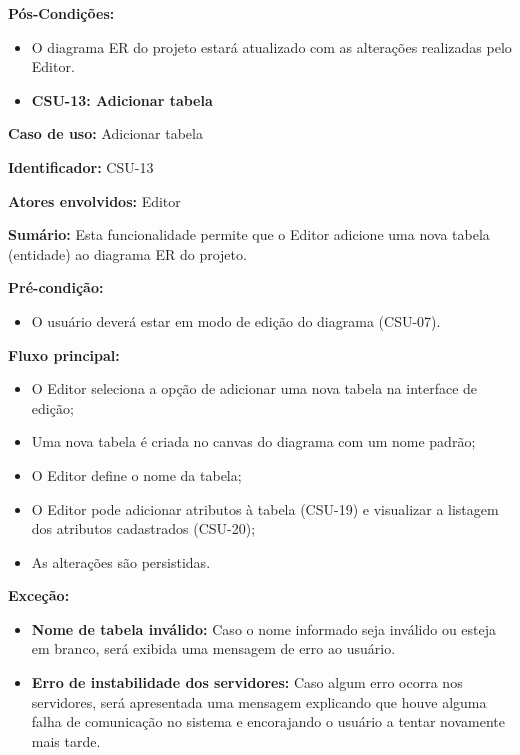 \textbf{Pós-Condições:}
\begin{itemize}
    \item O diagrama ER do projeto estará atualizado com as alterações realizadas pelo Editor.
\end{itemize}

\vspace{1em}

\begin{itemize}
    \item \textbf{CSU-13: Adicionar tabela}
\end{itemize}

\textbf{Caso de uso:} Adicionar tabela

\textbf{Identificador:} CSU-13

\textbf{Atores envolvidos:} Editor

\textbf{Sumário:} Esta funcionalidade permite que o Editor adicione uma nova tabela (entidade) ao diagrama ER do projeto.

\textbf{Pré-condição:}
\begin{itemize}
    \item O usuário deverá estar em modo de edição do diagrama (CSU-07).
\end{itemize}

\textbf{Fluxo principal:}
\begin{itemize}
    \item O Editor seleciona a opção de adicionar uma nova tabela na interface de edição;
    \item Uma nova tabela é criada no canvas do diagrama com um nome padrão;
    \item O Editor define o nome da tabela;
    \item O Editor pode adicionar atributos à tabela (CSU-19) e visualizar a listagem dos atributos cadastrados (CSU-20);
    \item As alterações são persistidas.
\end{itemize}

\textbf{Exceção:}
\begin{itemize}
    \item \textbf{Nome de tabela inválido:} Caso o nome informado seja inválido ou esteja em branco, será exibida uma mensagem de erro ao usuário.
    \item \textbf{Erro de instabilidade dos servidores:} Caso algum erro ocorra nos servidores, será apresentada uma mensagem explicando que houve alguma falha de comunicação no sistema e encorajando o usuário a tentar novamente mais tarde.
\end{itemize}

